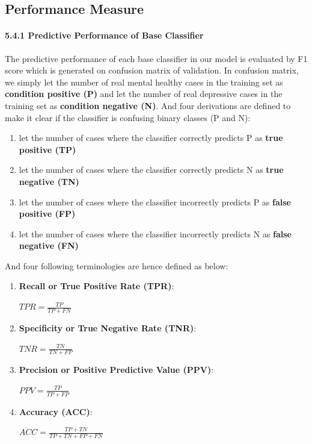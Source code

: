 \documentclass[runningheads]{llncs}
\begin{document}
\subsection{Performance Measure}
\paragraph{5.4.1 Predictive Performance of Base Classifier}
The predictive performance of each base classifier in our model is evaluated by F1 score which is generated on confusion matrix of validation. In confusion matrix, we simply let the number of real mental healthy cases in the training set as \textbf{condition positive (P)} and let the number of real depressive cases in the training set as  \textbf{condition negative (N)}. And four derivations are defined to make it clear if the classifier is confusing binary classes (P and N):  \\
\begin{enumerate}[label=(\roman*)]
\item let the number of cases where the classifier correctly predicts P as \textbf{ true positive (TP)}
\item let the number of cases where the classifier correctly predicts N as \textbf{true negative (TN)}
\item let the number of cases where the classifier incorrectly predicts P as \textbf{false positive (FP)}
\item let the number of cases where the classifier incorrectly predicts N as \textbf{false negative (FN)}
\end{enumerate}
And four following terminologies are hence defined as below:
\begin{enumerate}[label=\alph*)]
\item \textbf{ Recall or True Positive Rate (TPR)}: \\ 
		\begin{center} $\displaystyle TPR = \frac{TP}{TP + FN} $ \end{center}
\item \textbf{Specificity or True Negative Rate (TNR)}: \\ 
		\begin{center} $\displaystyle TNR = \frac{TN}{TN + FP} $ \end{center}
\item \textbf{Precision or Positive Predictive Value (PPV)}: \\
		\begin{center} $\displaystyle PPV = \frac{TP}{TP + FP} $ \end{center}
\item \textbf{Accuracy (ACC)}: \\ 
		\begin{center} $\displaystyle ACC = \frac{TP + TN}{TP + TN + FP + FN} $ \end{center}
\end{enumerate}
\end{document}
